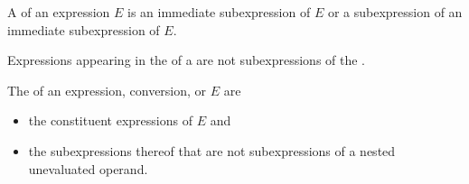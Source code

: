 \pnum
A  of an expression $E$ is
an immediate subexpression of $E$ or
a subexpression of an immediate subexpression of $E$.
\begin{note}
Expressions appearing in the  of a 
are not subexpressions of the .
\end{note}
The  of
an expression, conversion, or  $E$ are
\begin{itemize}
\item
the constituent expressions of $E$ and
\item
the subexpressions thereof that
are not subexpressions of a nested unevaluated operand.
\end{itemize}

